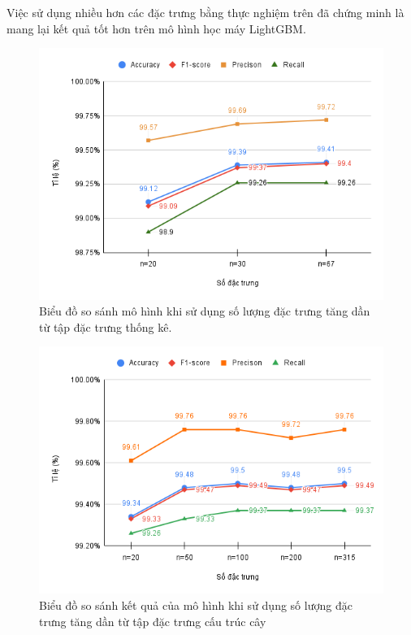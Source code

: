 \documentclass[./../main.tex]{subfiles}
\begin{document}
Việc sử dụng nhiều hơn các đặc trưng bằng thực nghiệm trên đã chứng minh là mang lại kết quả tốt hơn trên mô hình học máy LightGBM.

\begin{figure}[H]
	\centering
	\includegraphics[width=\linewidth]{./images/exp1_top_all_general_feat.png}
	\caption{Biểu đồ so sánh mô hình khi sử dụng số lượng đặc trưng tăng dần từ tập đặc trưng thống kê.}
	\label{fig:exp1_top_all_general_feat}
\end{figure}

\begin{figure}[H]
	\centering
	\includegraphics[width=\linewidth]{./images/exp1_top_all_structual_path.png}
	\caption{Biểu đồ so sánh kết quả của mô hình khi sử dụng số lượng đặc trưng tăng dần từ tập đặc trưng cấu trúc cây}
	\label{fig:exp1_top_all_structual_path}
\end{figure}
\end{document}
